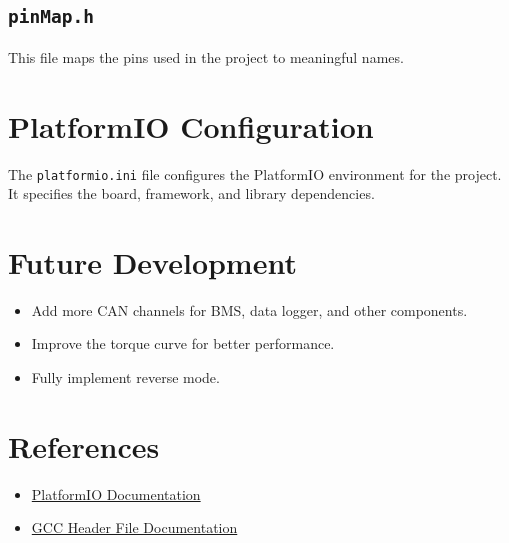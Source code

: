 \documentclass[a4paper,12pt]{article}
\begin{document}


\subsection{\texttt{pinMap.h}}
This file maps the pins used in the project to meaningful names.



\section{PlatformIO Configuration}
The \texttt{platformio.ini} file configures the PlatformIO environment for the project. It specifies the board, framework, and library dependencies.



\section{Future Development}
\begin{itemize}
    \item Add more CAN channels for BMS, data logger, and other components.
    \item Improve the torque curve for better performance.
    \item Fully implement reverse mode.
\end{itemize}

\section{References}
\begin{itemize}
    \item \href{https://docs.platformio.org/en/latest/}{PlatformIO Documentation}
    \item \href{https://gcc.gnu.org/onlinedocs/cpp/Header-Files.html}{GCC Header File Documentation}
\end{itemize}
\end{document}
